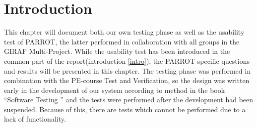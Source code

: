 \section{Introduction}
This chapter will document both our own testing phase as well as the usability test of PARROT, the latter performed in collaboration with all groups in the GIRAF Multi-Project.
While the usability test has been introduced in the common part of the report(introduction \autoref{intro}), the PARROT specific questions and results will be presented in this chapter.
The testing phase was performed in combination with the PE-course Test and Verification, so the design was written early in the development of our system according to method in the book ``Software Testing \cite{softtest}'' and the tests were performed after the development had been suspended.
Because of this, there are tests which cannot be performed due to a lack of functionality.

